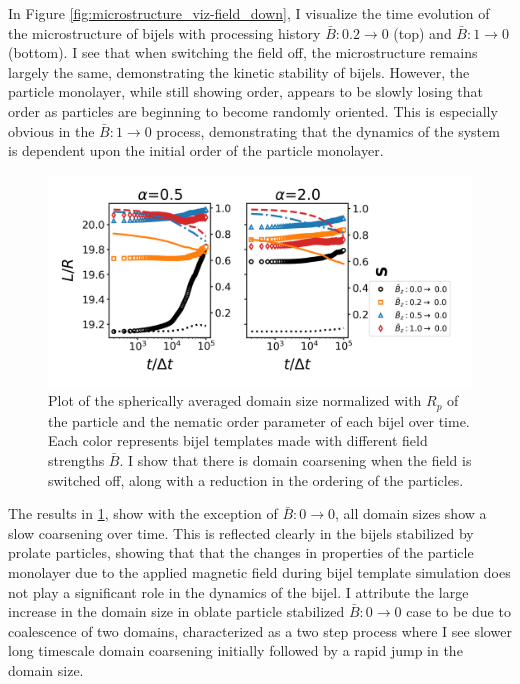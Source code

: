 In Figure \ref{fig:microstructure_viz-field_down}, I visualize the time
evolution of the microstructure of bijels with processing history
$\bar{B}:0.2 \rightarrow 0$ (top) and $\bar{B}:1 \rightarrow 0$
(bottom). I see that when switching the field off, the microstructure
remains largely the same, demonstrating the kinetic stability of bijels.
However, the particle monolayer, while still showing order, appears to
be slowly losing that order as particles are beginning to become
randomly oriented. This is especially obvious in the
$\bar{B}:1 \rightarrow 0$ process, demonstrating that the dynamics of
the system is dependent upon the initial order of the particle
monolayer.

\begin{figure} 
\centering 
\includegraphics[scale=0.5]{../figures/results/paper2/domain_size-field_down.png} 
\caption{Plot of the spherically averaged domain size normalized with $R_p$ of the particle and the nematic order parameter of each bijel over time. 
         Each color represents bijel templates made with different field strengths $\bar{B}$. I show that there is domain coarsening when the field 
         is switched off, along with a reduction in the ordering of the particles.} 
\label{fig:domain_size-field_down} 
\end{figure}

The results in \ref{fig:domain_size-field_down}, show with the exception of $\bar{B}:0\rightarrow0$, all
domain sizes show a slow coarsening over time. This is reflected clearly
in the bijels stabilized by prolate particles, showing that that the
changes in properties of the particle monolayer due to the applied
magnetic field during bijel template simulation does not play a
significant role in the dynamics of the bijel. I attribute the large
increase in the domain size in oblate particle stabilized
$\bar{B}:0\rightarrow0$ case to be due to coalescence of two
domains, characterized as a two step process where I see slower long
timescale domain coarsening initially followed by a rapid jump in the
domain size.

